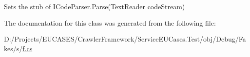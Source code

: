 Sets the stub of I\-Code\-Parser.\-Parse(\-Text\-Reader code\-Stream)



The documentation for this class was generated from the following file\-:\begin{DoxyCompactItemize}
\item 
D\-:/\-Projects/\-E\-U\-C\-A\-S\-E\-S/\-Crawler\-Framework/\-Service\-E\-U\-Cases.\-Test/obj/\-Debug/\-Fakes/s/\hyperlink{s_2f_8cs}{f.\-cs}\end{DoxyCompactItemize}
